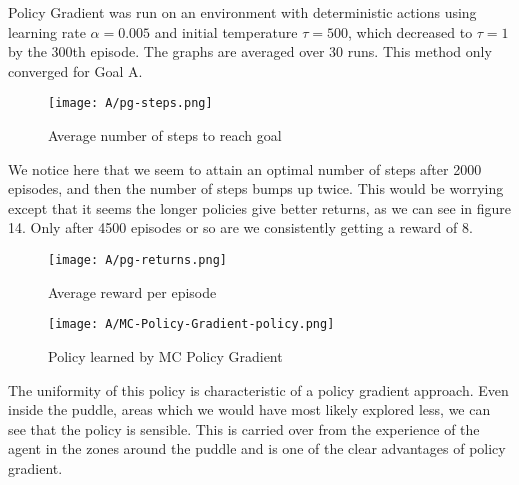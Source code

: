 \documentclass[a4paper]{article}
\begin{document}
Policy Gradient was run on an environment with deterministic actions using 
learning rate $\alpha = 0.005$ and initial temperature $\tau = 500$, which decreased to
$\tau = 1$ by the 300th episode.  The graphs are averaged over 30 runs. This method only converged for Goal A.

\begin{figure}[htbp!]
\center
\texttt{[image: A/pg-steps.png]}
\caption{Average number of steps to reach goal}
\end{figure}

We notice here that we seem to attain an optimal number of steps after 2000 episodes,
and then the number of steps bumps up twice.  This would be worrying except that it seems
the longer policies give better returns, as we can see in figure 14.  Only after 4500 episodes
or so are we consistently getting a reward of 8.

\begin{figure}[htbp!]
\center
\texttt{[image: A/pg-returns.png]}
\caption{Average reward per episode}
\end{figure}
\begin{figure}[htbp!]
\center
\texttt{[image: A/MC-Policy-Gradient-policy.png]}
\caption{Policy learned by MC Policy Gradient}
\end{figure}
\newpage
The uniformity of this policy is characteristic of a policy gradient approach.  
Even inside the puddle, areas which we would have most likely explored less, we can see
that the policy is sensible.  This is carried over from the experience of the agent in 
the zones around the puddle and is one of the clear advantages of policy gradient.
\end{document}
